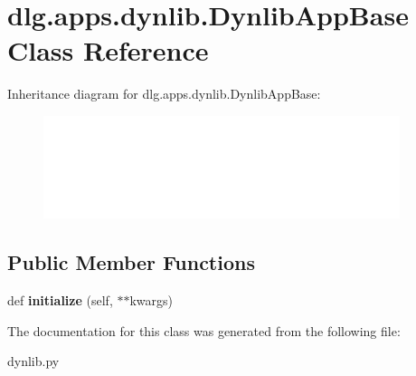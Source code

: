 \hypertarget{classdlg_1_1apps_1_1dynlib_1_1_dynlib_app_base}{}\section{dlg.\+apps.\+dynlib.\+Dynlib\+App\+Base Class Reference}
\label{classdlg_1_1apps_1_1dynlib_1_1_dynlib_app_base}
Inheritance diagram for dlg.\+apps.\+dynlib.\+Dynlib\+App\+Base\+:\begin{figure}[H]
\begin{center}
\leavevmode
\includegraphics[height=3.000000cm]{classdlg_1_1apps_1_1dynlib_1_1_dynlib_app_base}
\end{center}
\end{figure}
\subsection*{Public Member Functions}
\begin{DoxyCompactItemize}
\item 
\mbox{\label{classdlg_1_1apps_1_1dynlib_1_1_dynlib_app_base_aef9c24c212ff6e09d054b355540d9abf}} 
def {\bfseries initialize} (self, $\ast$$\ast$kwargs)
\end{DoxyCompactItemize}


The documentation for this class was generated from the following file\+:\begin{DoxyCompactItemize}
\item 
dynlib.\+py\end{DoxyCompactItemize}
